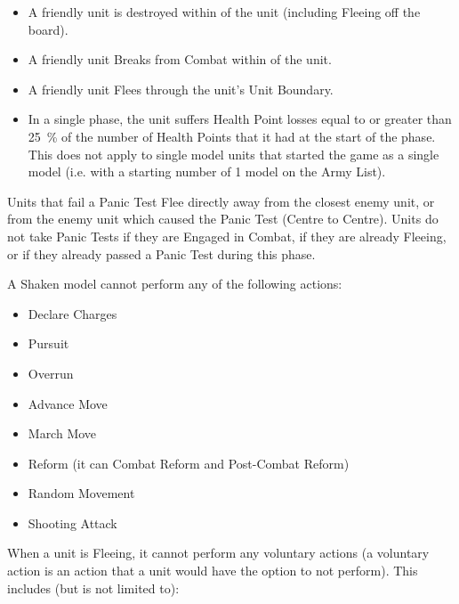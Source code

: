 \documentclass[a4paper,10pt]{article}
\begin{document}
\begin{minipage}[t]{0.485\textwidth}


\begin{itemize}[itemsep=0pt]
\item A friendly unit is destroyed within  of the unit (including Fleeing off the board).
\item A friendly unit Breaks from Combat within  of the unit.
\item A friendly unit Flees through the unit's Unit Boundary.
\item In a single phase, the unit suffers Health Point losses equal to or greater than \SI{25}{\percent} of the number of Health Points that it had at the start of the phase. This does not apply to single model units that started the game as a single model (i.e. with a starting number of 1 model on the Army List).
\end{itemize}

Units that fail a Panic Test Flee directly away from the closest enemy unit, or from the enemy unit which caused the Panic Test (Centre to Centre). Units do not take Panic Tests if they are Engaged in Combat, if they are already Fleeing, or if they already passed a Panic Test during this phase.


A Shaken model cannot perform any of the following actions:

\begin{itemize}[itemsep=0pt]
\item Declare Charges
\item Pursuit
\item Overrun
\item Advance Move
\item March Move
\item Reform (it can Combat Reform and Post-Combat Reform)
\item Random Movement
\item Shooting Attack
\end{itemize}

\end{minipage}\hfill\begin{minipage}[t]{0.485\textwidth}


When a unit is Fleeing, it cannot perform any voluntary actions (a voluntary action is an action that a unit would have the option to not perform). This includes (but is not limited to):


\end{minipage}
\end{document}
